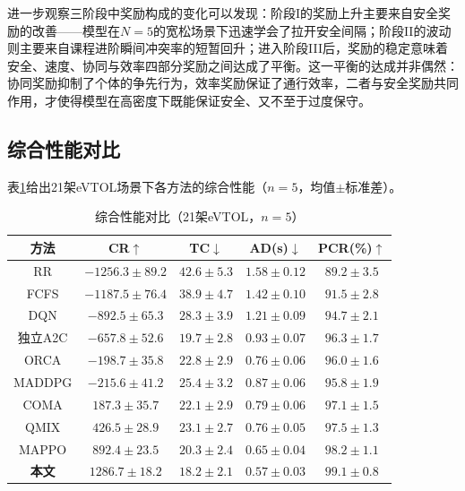 \documentclass[12pt,a4paper,UTF8]{ctexart}
\begin{document}
进一步观察三阶段中奖励构成的变化可以发现：阶段I的奖励上升主要来自安全奖励的改善——模型在$N=5$的宽松场景下迅速学会了拉开安全间隔；阶段II的波动则主要来自课程进阶瞬间冲突率的短暂回升；进入阶段III后，奖励的稳定意味着安全、速度、协同与效率四部分奖励之间达成了平衡。这一平衡的达成并非偶然：协同奖励抑制了个体的争先行为，效率奖励保证了通行效率，二者与安全奖励共同作用，才使得模型在高密度下既能保证安全、又不至于过度保守。

\subsection{综合性能对比}

表\ref{tab:comparison}给出21架eVTOL场景下各方法的综合性能（$n=5$，均值$\pm$标准差）。

\begin{table}[H]
    \centering
    \caption{综合性能对比（21架eVTOL，$n=5$）}
    \label{tab:comparison}
    \begin{tabular}{|c|c|c|c|c|}
        \hline
        \textbf{方法} & \textbf{CR$\uparrow$} & \textbf{TC$\downarrow$} & \textbf{AD(s)$\downarrow$} & \textbf{PCR(\%)$\uparrow$} \\
        \hline
        RR & $-1256.3\pm89.2$ & $42.6\pm5.3$ & $1.58\pm0.12$ & $89.2\pm3.5$ \\
        FCFS & $-1187.5\pm76.4$ & $38.9\pm4.7$ & $1.42\pm0.10$ & $91.5\pm2.8$ \\
        DQN & $-892.5\pm65.3$ & $28.3\pm3.9$ & $1.21\pm0.09$ & $94.7\pm2.1$ \\
        独立A2C & $-657.8\pm52.6$ & $19.7\pm2.8$ & $0.93\pm0.07$ & $96.3\pm1.7$ \\
        ORCA & $-198.7\pm35.8$ & $22.8\pm2.9$ & $0.76\pm0.06$ & $96.0\pm1.6$ \\
        MADDPG & $-215.6\pm41.2$ & $25.4\pm3.2$ & $0.87\pm0.06$ & $95.8\pm1.9$ \\
        COMA & $187.3\pm35.7$ & $22.1\pm2.9$ & $0.79\pm0.06$ & $97.1\pm1.5$ \\
        QMIX & $426.5\pm28.9$ & $23.1\pm2.7$ & $0.76\pm0.05$ & $97.5\pm1.3$ \\
        MAPPO & $892.4\pm23.5$ & $20.3\pm2.4$ & $0.65\pm0.04$ & $98.2\pm1.1$ \\
        \textbf{本文} & $\mathbf{1286.7\pm18.2}$ & $\mathbf{18.2\pm2.1}$ & $\mathbf{0.57\pm0.03}$ & $\mathbf{99.1\pm0.8}$ \\
        \hline
    \end{tabular}
\end{table}
\end{document}
